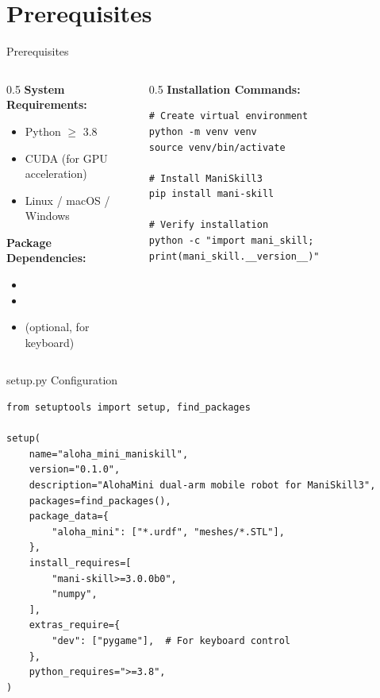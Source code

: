 \documentclass[aspectratio=169]{beamer}
\begin{document}
\section{Prerequisites}

\begin{frame}[fragile]{Prerequisites}
\begin{columns}
\begin{column}{0.5\textwidth}
    \textbf{System Requirements:}
    \begin{itemize}
        \item Python $\geq$ 3.8
        \item CUDA (for GPU acceleration)
        \item Linux / macOS / Windows
    \end{itemize}

    \vspace{0.3cm}

    \textbf{Package Dependencies:}
    \begin{itemize}
        \item {}
        \item {}
        \item {} (optional, for keyboard)
    \end{itemize}
\end{column}
\begin{column}{0.5\textwidth}
\textbf{Installation Commands:}
\begin{lstlisting}[basicstyle=\ttfamily\scriptsize]
# Create virtual environment
python -m venv venv
source venv/bin/activate

# Install ManiSkill3
pip install mani-skill

# Verify installation
python -c "import mani_skill; print(mani_skill.__version__)"
\end{lstlisting}
\end{column}
\end{columns}
\end{frame}

\begin{frame}[fragile]{setup.py Configuration}
\begin{lstlisting}
from setuptools import setup, find_packages

setup(
    name="aloha_mini_maniskill",
    version="0.1.0",
    description="AlohaMini dual-arm mobile robot for ManiSkill3",
    packages=find_packages(),
    package_data={
        "aloha_mini": ["*.urdf", "meshes/*.STL"],
    },
    install_requires=[
        "mani-skill>=3.0.0b0",
        "numpy",
    ],
    extras_require={
        "dev": ["pygame"],  # For keyboard control
    },
    python_requires=">=3.8",
)
\end{lstlisting}
\end{frame}
\end{document}
